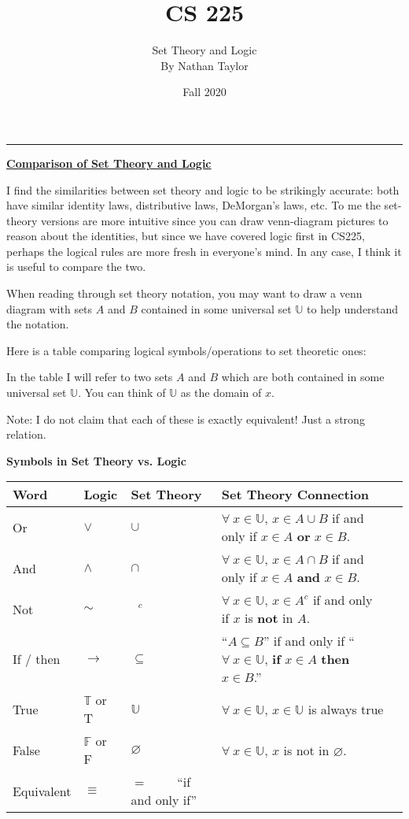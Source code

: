 \documentclass[11pt]{article}
\title{CS 225}
\author{{\Large Set Theory and Logic} \\ {\small By Nathan Taylor}}
\date{Fall 2020}
\begin{document}
\maketitle
\hrule

\begin{center}\underline{\bf \huge Comparison of Set Theory and Logic}\end{center}
\bigskip

I find the similarities between set theory and logic to be strikingly accurate:
both have similar identity laws, distributive laws, DeMorgan's laws, etc. 
To me the set-theory versions are more intuitive since you can draw venn-diagram
pictures to reason about the identities, but since we have covered logic first in 
CS225, perhaps the logical rules are more fresh in everyone's mind. In any case, 
I think it is useful to compare the two. 

\bigskip 
When reading through set theory notation, you may want to draw a venn diagram with 
sets $A$ and $B$ contained in some universal set $\mathbb{U}$ to help understand the 
notation. 

\bigskip
Here is a table comparing logical symbols/operations to set theoretic ones:

In the table I will refer to two sets $A$ and $B$ which are both contained 
in some universal set $\mathbb{U}$. You can think of $\mathbb{U}$ as the 
domain of $x$. 

Note: I do not claim that each of these is exactly equivalent! Just a strong 
relation. 

\begin{center}
    {\bf Symbols in Set Theory vs. Logic}

\begin{tabular}{lllll}
\toprule
Word & Logic & Set Theory & Set Theory Connection  \\
\midrule
Or   &     $\vee$   &         $\cup$    &  $\forall \ x \in \mathbb{U}$, $x \in A\cup B$ if and only if $x \in A$ {\bf or} $x\in B$. \\
And  &     $\wedge$ &         $\cap$    &  $\forall \ x \in \mathbb{U}$, $x \in A \cap B$ if and only if $x \in A$ {\bf and} $x \in B$. \\
Not  &     $\sim$   &   $\phantom{h}^c$ & $\forall \ x \in \mathbb{U}$, $x\in A^c$ if and only if $x$ is {\bf not} in $A$. \\
If / then & $\to$   &  $\subseteq$      & ``$A \subseteq B$'' if and only if ``$\forall \ x \in \mathbb{U}$, {\bf if} $x\in A$ {\bf then} $x\in B$.'' \\
True & $\mathbb{T}$ or T & $\mathbb{U}$ & $\forall \ x\in \mathbb{U}$, $x \in \mathbb{U}$ is always true\\
False & $\mathbb{F}$ or F & $\varnothing$ & $\forall \ x\in \mathbb{U}$, $x$ is not in $\varnothing$. \\
Equivalent & $\equiv$ &  $=$ \ \ \ \  ``if and only if''    \\
\bottomrule
\end{tabular}
\end{center}
\end{document}
